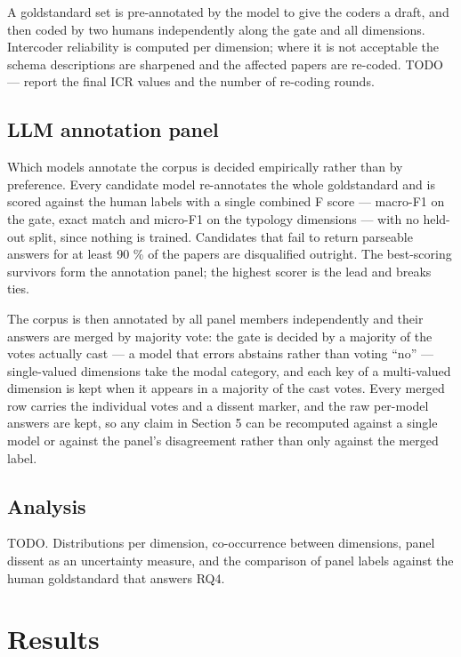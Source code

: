 \documentclass[
        pdflatex,sn-basic,lineno
    ]{sn-jnl}
\begin{document}
    A goldstandard set is pre-annotated by the model to give the coders
    a draft, and then coded by two humans independently along the gate
    and all \NumDimensions dimensions. Intercoder reliability is
    computed per dimension; where it is not acceptable the schema
    descriptions are sharpened and the affected papers are re-coded.
    TODO --- report the final ICR values and the number of re-coding
    rounds.

    \subsection{LLM annotation panel}\label{llm-annotation-panel}

    Which models annotate the corpus is decided empirically rather than
    by preference. Every candidate model re-annotates the whole
    goldstandard and is scored against the human labels with a single
    combined F score --- macro-F1 on the gate, exact match and micro-F1
    on the typology dimensions --- with no held-out split, since nothing
    is trained. Candidates that fail to return parseable answers for at
    least 90 \% of the papers are disqualified outright. The
    \PanelSize best-scoring survivors form the annotation panel; the
    highest scorer is the lead and breaks ties.

    The corpus is then annotated by all \PanelSize panel members
    independently and their answers are merged by majority vote: the
    gate is decided by a majority of the votes actually cast --- a model
    that errors abstains rather than voting ``no'' --- single-valued
    dimensions take the modal category, and each key of a multi-valued
    dimension is kept when it appears in a majority of the cast votes.
    Every merged row carries the individual votes and a dissent marker,
    and the raw per-model answers are kept, so any claim in Section 5
    can be recomputed against a single model or against the panel's
    disagreement rather than only against the merged label.

    \subsection{Analysis}\label{analysis}

    TODO. Distributions per dimension, co-occurrence between dimensions,
    panel dissent as an uncertainty measure, and the comparison of panel
    labels against the human goldstandard that answers RQ4.

    \section{Results}\label{results}
\end{document}
